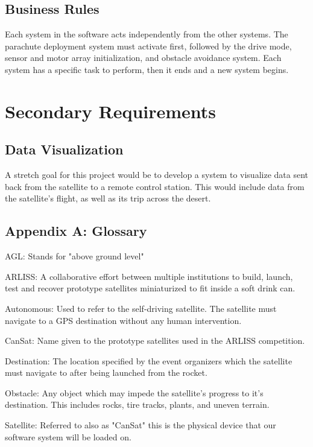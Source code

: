 \documentclass[10pt,onecolumn,draftclsnofoot,document]{IEEEtran}
\newenvironment{hangingpar}[1]
{\begin{list}
          {}{
		\setlength{\itemindent}{-#1}
           	\setlength{\leftmargin}{#1}
           	\setlength{\itemsep}{0pt}
           	\setlength{\parsep}{\parskip}
           	\setlength{\topsep}{\parskip}
           }
    	\setlength{\parindent}{-#1}%
    	\item[]
}
{\end{list}}
\begin{document}
\subsection{Business Rules}
Each system in the software acts independently from the other systems. The parachute deployment system must activate first, followed by the drive mode, sensor and motor array initialization, and obstacle avoidance system. Each system has a specific task to perform, then it ends and a new system begins.

\section{Secondary Requirements}
\subsection{Data Visualization}
A stretch goal for this project would be to develop a system to visualize data sent back from the satellite to a remote control station. This would include data from the satellite's flight, as well as its trip across the desert.

\clearpage
\subsection{Appendix A: Glossary}

\begin{hangingpar}{3em}{}
\vspace{.7cm}
AGL:  Stands for "above ground level"
\vspace{.3cm}
\par
ARLISS: A collaborative effort between multiple institutions to build, launch, test and recover prototype satellites miniaturized to fit inside a soft drink can.
\vspace{.3cm}
\par
Autonomous: Used to refer to the self-driving satellite. The satellite must navigate to a GPS destination without any human intervention.
\vspace{.3cm}
\par
CanSat: Name given to the prototype satellites used in the ARLISS competition.
\vspace{.3cm}
\par
Destination: The location specified by the event organizers which the satellite must navigate to after being launched from the rocket.
\vspace{.3cm}
\par
Obstacle: Any object which may impede the satellite's progress to it's destination. This includes rocks, tire tracks, plants, and uneven terrain.
\vspace{.3cm}
\par
Satellite: Referred to also as "CanSat" this is the physical device that our software system will be loaded on.
\vspace{.3cm}


\end{hangingpar}
\clearpage
\end{document}
